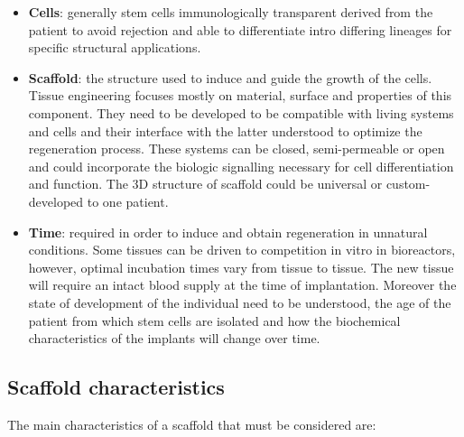 \begin{multicols}{2}
  \begin{itemize}
    \item \textbf{Cells}: generally stem cells immunologically transparent derived from the patient to avoid rejection and able to differentiate intro differing lineages for specific structural applications.
    \item \textbf{Scaffold}: the structure used to induce and guide the growth of the cells.
      Tissue engineering focuses mostly on material, surface and properties of this component.
      They need to be developed to be compatible with living systems and cells and their interface with the latter understood to optimize the regeneration process.
      These systems can be closed, semi-permeable or open and could incorporate the biologic signalling necessary for cell differentiation and function.
      The 3D structure of scaffold could be universal or custom-developed to one patient.
    \item \textbf{Time}: required in order to induce and obtain regeneration in unnatural conditions.
      Some tissues can be driven to competition in vitro in bioreactors, however, optimal incubation times vary from tissue to tissue.
      The new tissue will require an intact blood supply at the time of implantation.
      Moreover the state of development of the individual need to be understood, the age of the patient from which stem cells are isolated and how the biochemical characteristics of the implants will change over time.
  \end{itemize}
\end{multicols}

  \subsection{Scaffold characteristics}
  The main characteristics of a scaffold that must be considered are:

